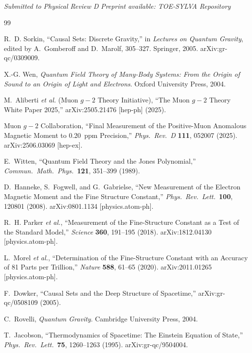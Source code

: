 \documentclass[11pt,a4paper]{article}
\theoremstyle{plain}
\theoremstyle{definition}
\begin{document}
\textit{Submitted to Physical Review D}
\textit{Preprint available: TOE-SYLVA Repository}

\begin{thebibliography}{99}

R.~D. Sorkin, ``Causal Sets: Discrete Gravity,'' in \textit{Lectures on Quantum Gravity}, edited by A.~Gomberoff and D.~Marolf, 305--327. Springer, 2005. arXiv:gr-qc/0309009.

X.-G. Wen, \textit{Quantum Field Theory of Many-Body Systems: From the Origin of Sound to an Origin of Light and Electrons}. Oxford University Press, 2004.

M.~Aliberti \textit{et al.} (Muon $g-2$ Theory Initiative), ``The Muon $g-2$ Theory White Paper 2025,'' arXiv:2505.21476 [hep-ph] (2025).

Muon $g-2$ Collaboration, ``Final Measurement of the Positive-Muon Anomalous Magnetic Moment to 0.20~ppm Precision,'' \textit{Phys.\ Rev.\ D} \textbf{111}, 052007 (2025). arXiv:2506.03069 [hep-ex].

E.~Witten, ``Quantum Field Theory and the Jones Polynomial,'' \textit{Commun.\ Math.\ Phys.}\ \textbf{121}, 351--399 (1989).

D.~Hanneke, S.~Fogwell, and G.~Gabrielse, ``New Measurement of the Electron Magnetic Moment and the Fine Structure Constant,'' \textit{Phys.\ Rev.\ Lett.}\ \textbf{100}, 120801 (2008). arXiv:0801.1134 [physics.atom-ph].

R.~H. Parker \textit{et al.}, ``Measurement of the Fine-Structure Constant as a Test of the Standard Model,'' \textit{Science} \textbf{360}, 191--195 (2018). arXiv:1812.04130 [physics.atom-ph].

L.~Morel \textit{et al.}, ``Determination of the Fine-Structure Constant with an Accuracy of 81 Parts per Trillion,'' \textit{Nature} \textbf{588}, 61--65 (2020). arXiv:2011.01265 [physics.atom-ph].

F.~Dowker, ``Causal Sets and the Deep Structure of Spacetime,'' arXiv:gr-qc/0508109 (2005).

C.~Rovelli, \textit{Quantum Gravity}. Cambridge University Press, 2004.

T.~Jacobson, ``Thermodynamics of Spacetime: The Einstein Equation of State,'' \textit{Phys.\ Rev.\ Lett.}\ \textbf{75}, 1260--1263 (1995). arXiv:gr-qc/9504004.


\end{thebibliography}
\end{document}
